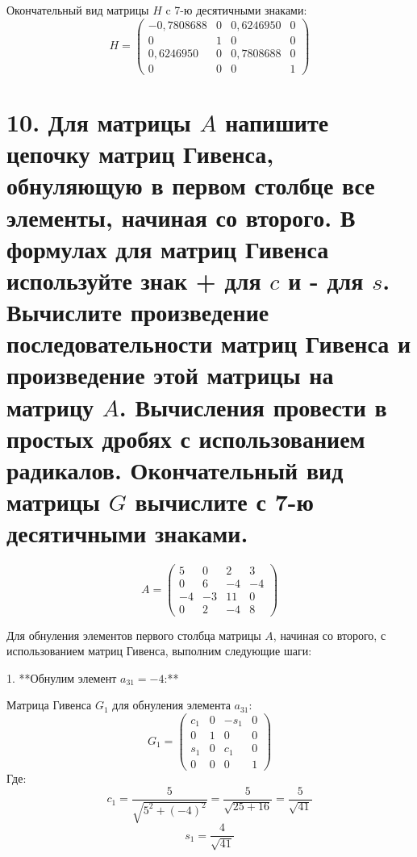 \documentclass[a4paper,14pt]{article}
\begin{document}
Окончательный вид матрицы $H$ c 7-ю десятичными знаками:
$$
H = \begin{pmatrix}
        -0,7808688 & 0 & 0,6246950 & 0 \\
        0          & 1 & 0         & 0 \\
        0,6246950  & 0 & 0,7808688 & 0 \\
        0          & 0 & 0         & 1
    \end{pmatrix}
$$

\section{10. Для матрицы $A$ напишите цепочку матриц Гивенса, обнуляющую в первом столбце все элементы, начиная со второго. В формулах для матриц Гивенса используйте знак + для $c$ и - для $s$. Вычислите произведение последовательности матриц Гивенса и произведение этой матрицы на матрицу $A$. Вычисления провести в простых дробях с использованием радикалов. Окончательный вид матрицы $G$ вычислите с 7-ю десятичными знаками.}
$$
A = \begin{pmatrix}
5 & 0 & 2 & 3 \\
0 & 6 & -4 & -4 \\
-4 & -3 & 11 & 0 \\
0 & 2 & -4 & 8
\end{pmatrix}
$$

Для обнуления элементов первого столбца матрицы \( A \), начиная со второго, с использованием матриц Гивенса, выполним следующие шаги:

1. **Обнулим элемент \( a_{31} = -4 \):**

   Матрица Гивенса \( G_1 \) для обнуления элемента \( a_{31} \):
   \[
   G_1 = \begin{pmatrix}
   c_1 & 0 & -s_1 & 0 \\
   0 & 1 & 0 & 0 \\
   s_1 & 0 & c_1 & 0 \\
   0 & 0 & 0 & 1
   \end{pmatrix}
   \]
   Где:
   \[
   c_1 = \frac{5}{\sqrt{5^2 + (-4)^2}} = \frac{5}{\sqrt{25 + 16}} = \frac{5}{\sqrt{41}}
   \]
   \[
   s_1 = \frac{4}{\sqrt{41}}
   \]
\end{document}
